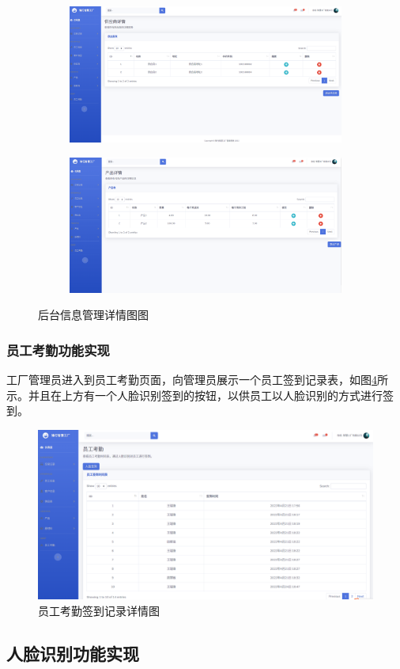 \begin{figure}[H]
\begin{subfigure}{.45\textwidth}
        \centering
        \includegraphics[width=\textwidth]{figures/5supplierdetail.png}
        \label{fig:spledtl}
    \end{subfigure}
    \qquad
    \begin{subfigure}{.45\textwidth}
        \centering
        \includegraphics[width=\textwidth]{figures/5productdetail.png}
        \label{fig:prdctdtl}
    \end{subfigure}
    \caption{后台信息管理详情图图}
\end{figure}

\subsubsection{员工考勤功能实现}

工厂管理员进入到员工考勤页面，向管理员展示一个员工签到记录表，如图\ref{fig:empleatd}所示。并且在上方有一个人脸识别签到的按钮，以供员工以人脸识别的方式进行签到。

\begin{figure}[H]
    \centering
    \includegraphics[width=.75\textwidth]{figures/5empleatd.png}
    \caption{员工考勤签到记录详情图}
    \label{fig:empleatd}
\end{figure}

\subsection{人脸识别功能实现}

